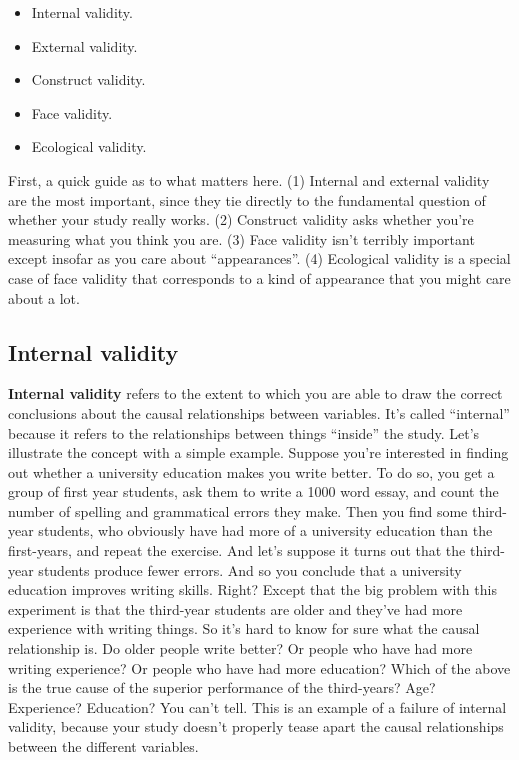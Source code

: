 \documentclass[
  a4paper,
]{book}
\providecommand{\tightlist}{%
  \setlength{\itemsep}{0pt}\setlength{\parskip}{0pt}}
\begin{document}
\begin{itemize}
\tightlist
\item
  Internal validity.
\item
  External validity.
\item
  Construct validity.
\item
  Face validity.
\item
  Ecological validity.
\end{itemize}

First, a quick guide as to what matters here. (1) Internal and external
validity are the most important, since they tie directly to the
fundamental question of whether your study really works. (2) Construct
validity asks whether you're measuring what you think you are. (3) Face
validity isn't terribly important except insofar as you care about
``appearances''. (4) Ecological validity is a special case of face
validity that corresponds to a kind of appearance that you might care
about a lot.

\subsection{Internal validity}\label{internal-validity}

\textbf{Internal validity} refers to the extent to which you are able to
draw the correct conclusions about the causal relationships between
variables. It's called ``internal'' because it refers to the
relationships between things ``inside'' the study. Let's illustrate the
concept with a simple example. Suppose you're interested in finding out
whether a university education makes you write better. To do so, you get
a group of first year students, ask them to write a 1000 word essay, and
count the number of spelling and grammatical errors they make. Then you
find some third-year students, who obviously have had more of a
university education than the first-years, and repeat the exercise. And
let's suppose it turns out that the third-year students produce fewer
errors. And so you conclude that a university education improves writing
skills. Right? Except that the big problem with this experiment is that
the third-year students are older and they've had more experience with
writing things. So it's hard to know for sure what the causal
relationship is. Do older people write better? Or people who have had
more writing experience? Or people who have had more education? Which of
the above is the true cause of the superior performance of the
third-years? Age? Experience? Education? You can't tell. This is an
example of a failure of internal validity, because your study doesn't
properly tease apart the causal relationships between the different
variables.
\end{document}
